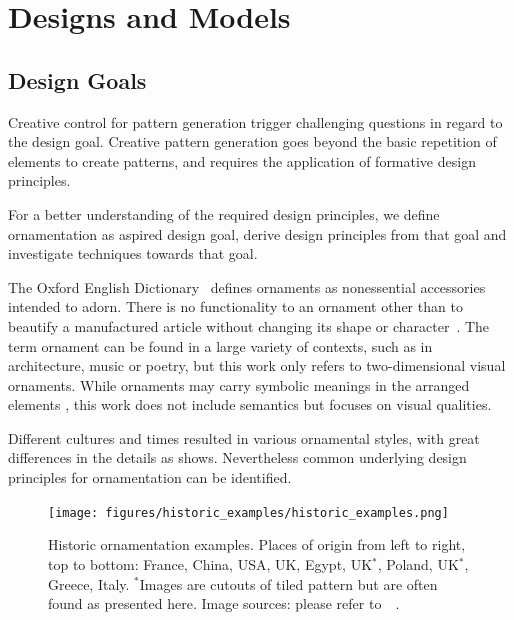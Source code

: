 
\section{Designs and Models}


\subsection{Design Goals}
\label{sec:design_goals}



Creative control for pattern generation trigger challenging questions in regard to the design goal. Creative pattern generation goes beyond the basic repetition of elements to create patterns, and requires the application of formative design principles.

For a better understanding of the required design principles, we define ornamentation as aspired design goal, derive design principles from that goal and investigate techniques towards that goal.

The Oxford English Dictionary~\cite{oed_2017} defines ornaments as nonessential accessories intended to adorn. There is no functionality to an ornament other than to beautify a manufactured article without changing its shape or character~\cite{ward_1896_tpo}. The term ornament can be found in a large variety of contexts, such as in architecture, music or poetry, but this work only refers to two-dimensional visual ornaments. While ornaments may carry symbolic meanings in the arranged elements \cite{wornum_1896_aof}, this work does not include semantics but focuses on visual qualities.

Different cultures and times resulted in various ornamental styles, with great differences in the details as  shows. Nevertheless common underlying design principles for ornamentation can be identified.

\begin{figure}
       \texttt{[image: figures/historic\_examples/historic\_examples.png]}
        \caption[Historic ornamentation examples]{\label{fig:historic_examples} Historic ornamentation examples. Places of origin from left to right, top to bottom:  France, China, USA, UK, Egypt, UK$^{*}$, Poland, UK$^{*}$, Greece, Italy. $^{*}$Images are cutouts of tiled pattern but are often found as presented here. Image sources: please refer to~~.}
\end{figure}

